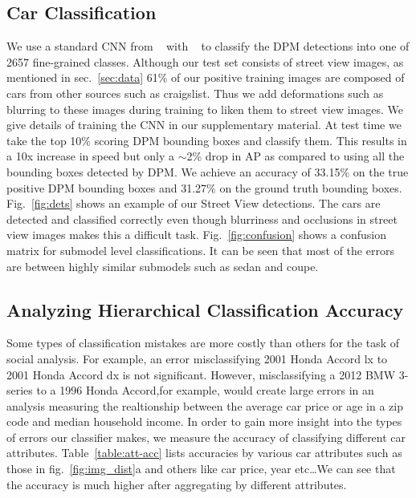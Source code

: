 \documentclass[10pt,twocolumn,letterpaper]{article}
\begin{document}
\subsection{Car Classification}
We use a standard CNN from ~\cite{alexnet} with ~\cite{caffe} to classify the DPM detections into one of 2657 fine-grained classes. Although our test set consists of street view images, as mentioned in sec.~\ref{sec:data} 61\% of our positive training images are composed of cars from other sources such as craigslist. Thus we add deformations such as blurring to these images during training to liken them to street view images. We give details of training the CNN in our supplementary material. At test time we take the top 10\% scoring DPM bounding boxes and classify them. This results in a 10x increase in speed but only a \(\sim\)2\% drop in AP as compared to using all the bounding boxes detected by DPM. We achieve an accuracy of 33.15\% on the true positive DPM bounding boxes and 31.27\% on the ground truth bounding boxes. Fig.~\ref{fig:dets} shows an example of our Street View detections. The cars are detected and classified correctly even though blurriness and occlusions in street view images makes this a difficult task. Fig.~\ref{fig:confusion} shows a confusion matrix for submodel level classifications. It can be seen that most of the errors are between highly similar submodels such as sedan and coupe.   

\subsection{Analyzing Hierarchical Classification Accuracy}
Some types of classification mistakes are more costly than others for the task of social analysis. For example, an error misclassifying 2001 Honda Accord lx to 2001 Honda Accord dx is not significant. However, misclassifying a 2012 BMW 3-series to a 1996 Honda Accord,for example, would create large errors in an analysis measuring the realtionship between the average car price or age in a zip code and median household income. In order to gain more insight into the types of errors our classifier makes, we measure the accuracy of classifying different car attributes. Table~\ref{table:att-acc} lists accuracies by various car attributes such as those in fig.~\ref{fig:img_dist}a and others like car price, year etc\ldots We can see that the accuracy is much higher after aggregating by different attributes.  
\end{document}
